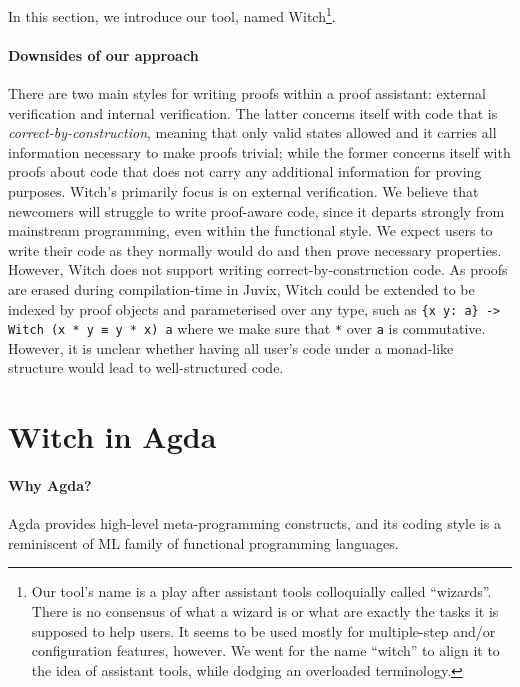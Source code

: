 \documentclass[acmsmall]{acmart}
\begin{document}
In this section, we introduce our tool, named Witch\footnote{Our tool's name is
  a play after assistant tools colloquially called ``wizards''. There is no
  consensus of what a wizard is or what are exactly the tasks it is supposed
  to help users. It seems to be used mostly for multiple-step and/or
  configuration features, however. We went for the name ``witch'' to align it to
the idea of assistant tools, while dodging an overloaded terminology.}.

\paragraph{Downsides of our approach}
There are two main styles for writing proofs within a proof assistant: external
verification and internal verification. The latter concerns itself with code
that is \textit{correct-by-construction}, meaning that only valid states allowed and it
carries all information necessary to make proofs trivial; while the former
concerns itself with proofs about code that does not carry any additional
information for proving purposes.
Witch's primarily focus is on external verification. We believe that newcomers
will struggle to write proof-aware code, since it departs strongly from
mainstream programming, even within the functional style. We expect users to
write their code as they normally would do and then prove necessary properties.
However, Witch does not support writing correct-by-construction code. As proofs
are erased during compilation-time in Juvix, Witch could be extended
to be indexed by proof objects and parameterised over any type, such as
\texttt{\{x y: a\} -> Witch (x * y ≡ y * x) a} where we make sure that \texttt{*}
over \texttt{a} is commutative. However, it is unclear whether having all user's code
under a monad-like structure would lead to well-structured code.

\section{Witch in Agda} \label{witch-agda}





\paragraph{Why Agda?} Agda provides high-level meta-programming constructs, and
its coding style is a reminiscent of ML family of functional programming languages.
\end{document}
